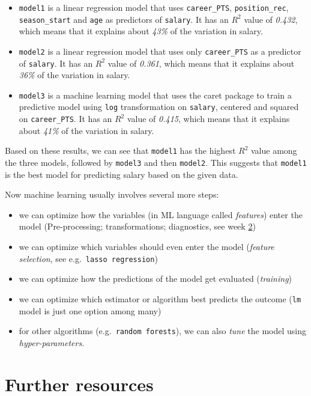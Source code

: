 \documentclass[
]{book}
\begin{document}
\begin{itemize}
\item
  \texttt{model1} is a linear regression model that uses \texttt{career\_PTS}, \texttt{position\_rec}, \texttt{season\_start} and \texttt{age} as predictors of \texttt{salary}. It has an \(R^2\) value of \emph{0.432}, which means that it explains about \emph{43\%} of the variation in salary.
\item
  \texttt{model2} is a linear regression model that uses only \texttt{career\_PTS} as a predictor of \texttt{salary}. It has an \(R^2\) value of \emph{0.361}, which means that it explains about \emph{36\%} of the variation in salary.
\item
  \texttt{model3} is a machine learning model that uses the caret package to train a predictive model using \texttt{log} transformation on \texttt{salary}, centered and squared on \texttt{career\_PTS}. It has an \(R^2\) value of \emph{0.415}, which means that it explains about \emph{41\%} of the variation in salary.
\end{itemize}

Based on these results, we can see that \texttt{model1} has the highest \(R^2\) value among the three models, followed by \texttt{model3} and then \texttt{model2}. This suggests that \texttt{model1} is the best model for predicting salary based on the given data.

Now machine learning usually involves several more steps:

\begin{itemize}
\item
  we can optimize how the variables (in ML language called \emph{features}) enter the model (Pre-processing; transformations; diagnostics, see week \protect\hyperlink{eda-1}{2})
\item
  we can optimize which variables should even enter the model (\emph{feature selection}, see e.g.~\texttt{lasso\ regression})
\item
  we can optimize how the predictions of the model get evaluated (\emph{training})
\item
  we can optimize which estimator or algorithm best predicts the outcome (\texttt{lm} model is just one option among many)
\item
  for other algorithms (e.g.~\texttt{random\ forests}), we can also \emph{tune} the model using \emph{hyper-parameters}.
\end{itemize}

\hypertarget{further-resources-3}{%
\section{Further resources}\label{further-resources-3}}
\end{document}
